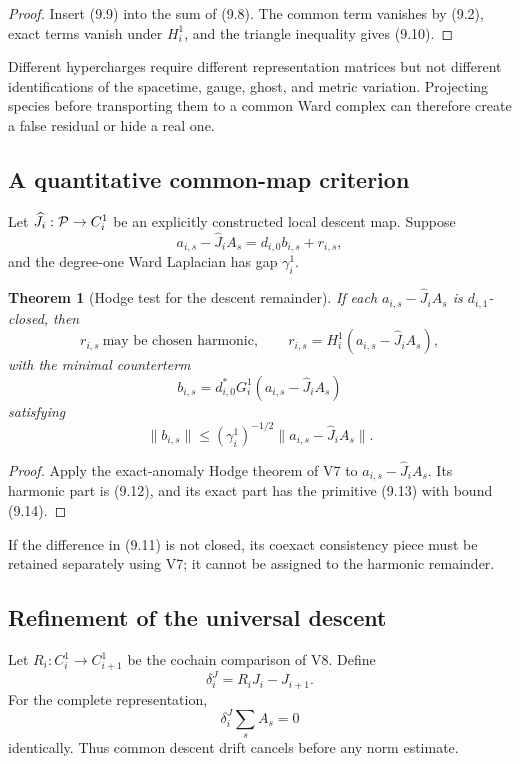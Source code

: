 \documentclass[11pt]{article}
\newtheorem{theorem}{Theorem}[section]
\theoremstyle{remark}
\begin{document}
\begin{proof}
Insert (9.9) into the sum of (9.8).  The common term vanishes by
(9.2), exact terms vanish under \(H_i^1\), and the triangle inequality
gives (9.10).
\end{proof}

Different hypercharges require different representation matrices but
not different identifications of the spacetime, gauge, ghost, and
metric variation.  Projecting species before transporting them to a
common Ward complex can therefore create a false residual or hide a
real one.

\subsection{A quantitative common-map criterion}

Let \(\widehat J_i:{\cal P}\to C_i^1\) be an explicitly constructed
local descent map.  Suppose
\[
 a_{i,s}-\widehat J_iA_s
                              =d_{i,0}b_{i,s}+r_{i,s},       \tag{9.11}
\]
and the degree-one Ward Laplacian has gap \(\gamma_i^1\).

\begin{theorem}[Hodge test for the descent remainder]
\label{thm:v12v9-hodge}
If each \(a_{i,s}-\widehat J_iA_s\) is \(d_{i,1}\)-closed, then
\[
 r_{i,s}\ \text{may be chosen harmonic},\qquad
 r_{i,s}=H_i^1(a_{i,s}-\widehat J_iA_s),                    \tag{9.12}
\]
with the minimal counterterm
\[
 b_{i,s}=d_{i,0}^*G_i^1
            (a_{i,s}-\widehat J_iA_s)                       \tag{9.13}
\]
satisfying
\[
 \|b_{i,s}\|
 \le(\gamma_i^1)^{-1/2}
       \|a_{i,s}-\widehat J_iA_s\|.                         \tag{9.14}
\]
\end{theorem}

\begin{proof}
Apply the exact-anomaly Hodge theorem of V7 to
\(a_{i,s}-\widehat J_iA_s\).  Its harmonic part is (9.12), and its
exact part has the primitive (9.13) with bound (9.14).
\end{proof}

If the difference in (9.11) is not closed, its coexact consistency
piece must be retained separately using V7; it cannot be assigned to
the harmonic remainder.

\subsection{Refinement of the universal descent}

Let \(R_i:C_i^1\to C_{i+1}^1\) be the cochain comparison of V8.
Define
\[
                              \delta_i^J
                    =R_iJ_i-J_{i+1}.                        \tag{9.15}
\]
For the complete representation,
\[
                              \delta_i^J\sum_sA_s=0          \tag{9.16}
\]
identically.  Thus common descent drift cancels before any norm
estimate.
\end{document}
